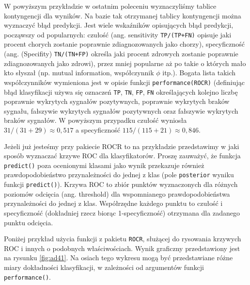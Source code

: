 \documentclass[polish,]{book}
\begin{document}
W powyższym przykładzie w ostatnim poleceniu wyznaczyliśmy tablice kontyngencji dla wyników. Na bazie tak otrzymanej tablicy kontyngencji można wyznaczyć błąd predykcji. Jest wiele wskaźników opisujących błąd predykcji, począwszy
od popularnych: czułość (ang. sensitivity \texttt{TP/(TP+FN)} opisuje jaki procent chorych
zostanie poprawnie zdiagnozowanych jako chorzy), specyficzność (ang. (Specifity)
\texttt{TN/(TN+FP)} określa jaki procent zdrowych zostanie poprawnie zdiagnozowanych jako zdrowi), przez mniej popularne aż po takie o których mało kto słyszał (np. mutual
information, współczynnik \(\phi\) itp.). Bogata lista takich współczynników wymieniona jest w opisie funkcji \texttt{performance(ROCR)} (definiując błąd klasyfikacji używa się
oznaczeń \texttt{TP}, \texttt{TN}, \texttt{FP}, \texttt{FN} określających kolejno liczbę poprawnie wykrytych sygnałów
pozytywnych, poprawnie wykrytych braków sygnału, fałszywie wykrytych sygnałów
pozytywnych oraz fałszywie wykrytych braków sygnałów. W powyższym przypadku
czułość wyniosła \(31/(31+29)\approx0,517\) a specyficzność \(115/(115+21)\approx 0,846\).

Jeżeli już jesteśmy przy pakiecie ROCR to na przykładzie przedstawimy w jaki sposób wyznaczać krzywe ROC dla klasyfikatorów. Proszę zauważyć, że funkcja
\texttt{predict()} poza ocenionymi klasami jako wynik przekazuje również prawdopodobieństwo przynależności do jednej z klas (pole \texttt{posterior} wyniku funkcji \texttt{predict()}).
Krzywa ROC to zbiór punktów wyznaczonych dla różnych poziomów odcięcia (ang.
threshold) dla wspomnianego prawdopodobieństwa przynależności do jednej z klas.
Współrzędne każdego punktu to czułość i specyficzność (dokładniej rzecz biorąc
1-specyficzność) otrzymana dla zadanego punktu odcięcia.

Poniżej przykład użycia funkcji z pakietu \texttt{ROCR}, służącej do rysowania krzywych
ROC i innych o podobnych właściwościach. Wynik graficzny przedstawiony jest na
rysunku \ref{fig:ad41}. Na osiach tego wykresu mogą być przedstawiane różne miary dokładności klasyfikacji, w zależności od argumentów funkcji \texttt{performance()}.
\end{document}
